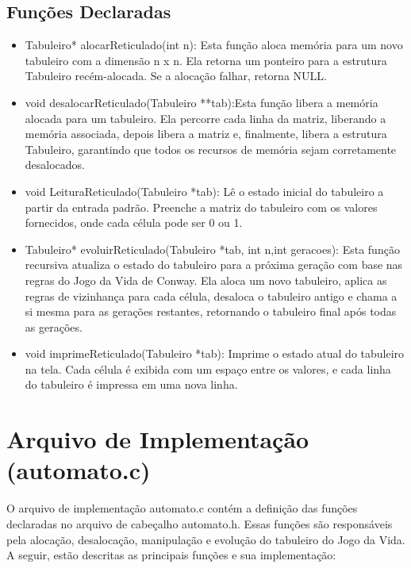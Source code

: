 \documentclass{article}
\begin{document}
 \subsection{Funções Declaradas}

 \begin{itemize}

 \item Tabuleiro* alocarReticulado(int n): Esta função aloca memória para um novo tabuleiro com a dimensão n x n. Ela retorna um ponteiro para a estrutura Tabuleiro recém-alocada. Se a alocação falhar, retorna NULL.

 \item void desalocarReticulado(Tabuleiro **tab):Esta função libera a memória alocada para um tabuleiro. Ela percorre cada linha da matriz, liberando a memória associada, depois libera a matriz e, finalmente, libera a estrutura Tabuleiro, garantindo que todos os recursos de memória sejam corretamente desalocados.

\item void LeituraReticulado(Tabuleiro *tab): Lê o estado inicial do tabuleiro a partir da entrada padrão. Preenche a matriz do tabuleiro com os valores fornecidos, onde cada célula pode ser 0 ou 1.

\item Tabuleiro* evoluirReticulado(Tabuleiro *tab, int n,int geracoes): Esta função recursiva atualiza o estado do tabuleiro para a próxima geração com base nas regras do Jogo da Vida de Conway. Ela aloca um novo tabuleiro, aplica as regras de vizinhança para cada célula, desaloca o tabuleiro antigo e chama a si mesma para as gerações restantes, retornando o tabuleiro final após todas as gerações.

\item void imprimeReticulado(Tabuleiro *tab): Imprime o estado atual do tabuleiro na tela. Cada célula é exibida com um espaço entre os valores, e cada linha do tabuleiro é impressa em uma nova linha.

 \end{itemize}


\section{Arquivo de Implementação (automato.c)}

O arquivo de implementação automato.c contém a definição das funções declaradas no arquivo de cabeçalho automato.h. Essas funções são responsáveis pela alocação, desalocação, manipulação e evolução do tabuleiro do Jogo da Vida. A seguir, estão descritas as principais funções e sua implementação:
\end{document}
